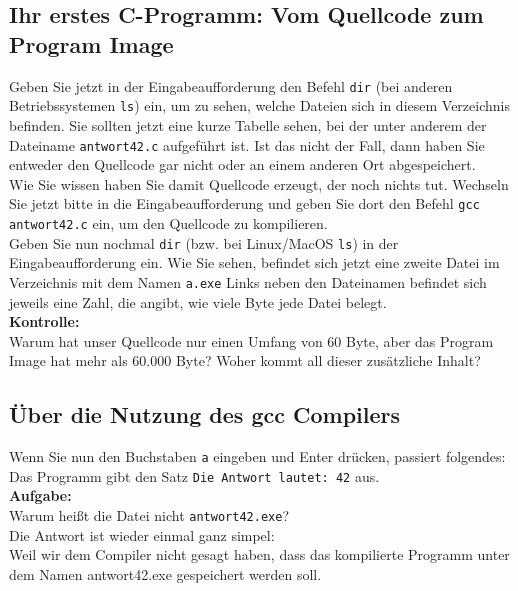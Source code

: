 \subsection{Ihr erstes C-Programm: Vom Quellcode zum Program Image}

Geben Sie jetzt in der Eingabeaufforderung den Befehl \verb|dir| (bei anderen Betriebssystemen \verb|ls|) ein, um zu sehen, welche Dateien sich in diesem Verzeichnis befinden. Sie sollten jetzt eine kurze Tabelle sehen, bei der unter anderem der Dateiname \verb|antwort42.c| aufgeführt ist. Ist das nicht der Fall, dann haben Sie entweder den Quellcode gar nicht oder an einem anderen Ort abgespeichert.\\

Wie Sie wissen haben Sie damit Quellcode erzeugt, der noch nichts tut. Wechseln Sie jetzt bitte in die Eingabeaufforderung und geben Sie dort den Befehl \verb|gcc antwort42.c| ein, um den Quellcode zu kompilieren.\\

Geben Sie nun nochmal \verb|dir| (bzw. bei Linux/MacOS \verb|ls|) in der Eingabeaufforderung ein. Wie Sie sehen, befindet sich jetzt eine zweite Datei im Verzeichnis mit dem Namen \verb|a.exe| Links neben den Dateinamen befindet sich jeweils eine Zahl, die angibt, wie viele Byte jede Datei belegt.\\

\textbf{Kontrolle:}\\

Warum hat unser Quellcode nur einen Umfang von 60 Byte, aber das Program Image hat mehr als 60.000 Byte? Woher kommt all dieser zusätzliche Inhalt?

\subsection{Über die Nutzung des gcc Compilers}

Wenn Sie nun den Buchstaben \verb|a| eingeben und Enter drücken, passiert folgendes: Das Programm gibt den Satz \verb|Die Antwort lautet: 42| aus.\\

\textbf{Aufgabe:}\\

Warum heißt die Datei nicht \verb|antwort42.exe|?\\

Die Antwort ist wieder einmal ganz simpel:\\

Weil wir dem Compiler nicht gesagt haben, dass das kompilierte Programm unter dem Namen antwort42.exe gespeichert werden soll.\\

